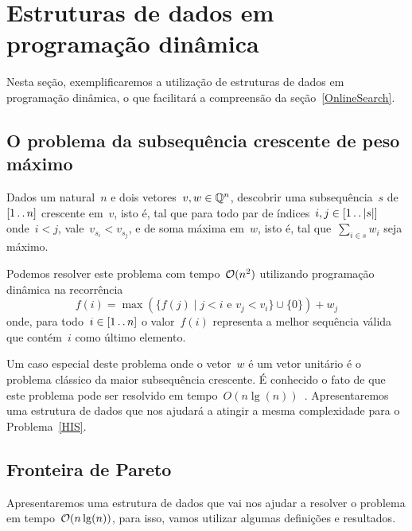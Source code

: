 \section{Estruturas de dados em programação dinâmica}
\label{EDPD}

Nesta seção, exemplificaremos a utilização de estruturas de dados em programação dinâmica, o que facilitará a compreensão da seção~\ref{OnlineSearch}.


\subsection{O problema da subsequência crescente de peso máximo}

\begin{prob} \label{HIS}
Dados um natural~$n$ e dois vetores~$v,w \in \mathbb{Q}^n$, descobrir uma subsequência~$s$ de~$[1 \,.\,.\, n]$ crescente em~$v$, isto é, tal que para todo par de índices~$i,j \in [1 \,.\,.\, |s|]$ onde~$i < j$, vale~$v_{s_i} < v_{s_j}$, e de soma máxima em~$w$, isto é, tal que~$\sum\limits_{i \in s} w_i$ seja máximo.
\end{prob}

Podemos resolver este problema com tempo~$\mathcal{O}(n^2)$ utilizando programação dinâmica na recorrência
\begin{equation} \label{EDPD:HIS:rec}
f(i) = \max(\{f(j) \mid j < i \text{ e } v_j < v_i\} \cup \{0\}) + w_j
\end{equation}
onde, para todo~$i \in [1 \,.\,.\, n]$ o valor~$f(i)$ representa a melhor sequência válida que contém~$i$ como último elemento.

Um caso especial deste problema onde o vetor~$w$ é um vetor unitário é o problema clássico da maior subsequência crescente. É conhecido o fato de que este problema pode ser resolvido em tempo~$O(n\lg(n))$~\cite{missing}. Apresentaremos uma estrutura de dados que nos ajudará a atingir a mesma complexidade para o Problema~\ref{HIS}.


\subsection{Fronteira de Pareto}

Apresentaremos uma estrutura de dados que vai nos ajudar a resolver o problema em tempo~$\mathcal{O}(n\lg(n))$, para isso, vamos utilizar algumas definições e resultados.

